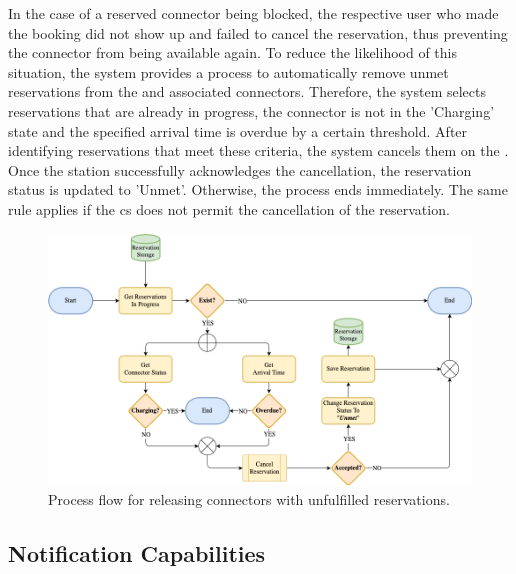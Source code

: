 In the case of a reserved connector being blocked, the respective user who made the booking did not show up and failed to cancel the reservation, thus preventing the connector from being available again.
To reduce the likelihood of this situation, the system provides a process to automatically remove unmet reservations from the  and associated connectors.
Therefore, the system selects reservations that are already in progress, the connector is not in the 'Charging' state and the specified arrival time is overdue by a certain threshold.
After identifying reservations that meet these criteria, the system cancels them on the . Once the station successfully acknowledges the cancellation, the reservation status is updated to 'Unmet'.
Otherwise, the process ends immediately. The same rule applies if the \acrshort{cs} does not permit the cancellation of the reservation.

\begin{figure}[h]
    \centering
    \includegraphics[scale=0.4]{resources/images/main/5_design/processes/scheduler/CancelUnmetReservation.png}
    \caption{Process flow for releasing connectors with unfulfilled reservations.}
    \label{fig:free-connector-flowchart}
\end{figure}

\newpage

\subsection{Notification Capabilities}
\label{ch:Design:sec:Reservation System:ssec:Notification Capabilities}

